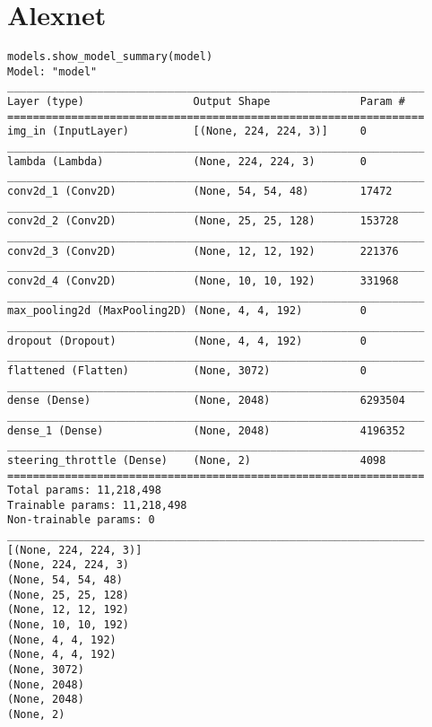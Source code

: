 \section{Alexnet}

\begin{verbatim}
models.show_model_summary(model)
Model: "model"
_________________________________________________________________
Layer (type)                 Output Shape              Param #   
=================================================================
img_in (InputLayer)          [(None, 224, 224, 3)]     0         
_________________________________________________________________
lambda (Lambda)              (None, 224, 224, 3)       0         
_________________________________________________________________
conv2d_1 (Conv2D)            (None, 54, 54, 48)        17472     
_________________________________________________________________
conv2d_2 (Conv2D)            (None, 25, 25, 128)       153728    
_________________________________________________________________
conv2d_3 (Conv2D)            (None, 12, 12, 192)       221376    
_________________________________________________________________
conv2d_4 (Conv2D)            (None, 10, 10, 192)       331968    
_________________________________________________________________
max_pooling2d (MaxPooling2D) (None, 4, 4, 192)         0         
_________________________________________________________________
dropout (Dropout)            (None, 4, 4, 192)         0         
_________________________________________________________________
flattened (Flatten)          (None, 3072)              0         
_________________________________________________________________
dense (Dense)                (None, 2048)              6293504   
_________________________________________________________________
dense_1 (Dense)              (None, 2048)              4196352   
_________________________________________________________________
steering_throttle (Dense)    (None, 2)                 4098      
=================================================================
Total params: 11,218,498
Trainable params: 11,218,498
Non-trainable params: 0
_________________________________________________________________
[(None, 224, 224, 3)]
(None, 224, 224, 3)
(None, 54, 54, 48)
(None, 25, 25, 128)
(None, 12, 12, 192)
(None, 10, 10, 192)
(None, 4, 4, 192)
(None, 4, 4, 192)
(None, 3072)
(None, 2048)
(None, 2048)
(None, 2)
\end{verbatim}

